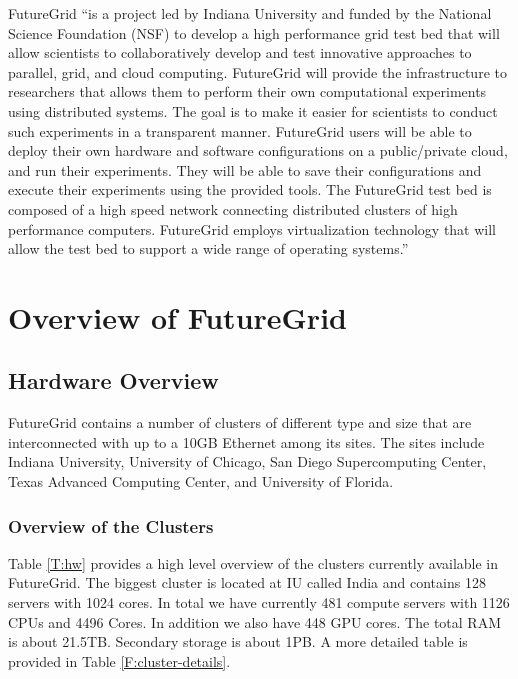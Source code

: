 \documentclass{article}
\newcommand{\FILE}[1]{}
\begin{document}
FutureGrid \cite{las2010gce,las12fg-bookchapter}``is a project led by Indiana University and funded by the National Science Foundation (NSF) to develop a high performance grid test bed that will allow scientists to collaboratively develop and test innovative approaches to parallel, grid, and cloud computing. FutureGrid will provide the infrastructure to researchers that allows them to perform their own computational experiments using distributed systems. The goal is to make it easier for scientists to conduct such experiments in a transparent manner.  FutureGrid users will be able to deploy their own hardware and software configurations on a public/private cloud, and run their experiments. They will be able to save their configurations and execute their experiments using the provided tools. The FutureGrid test bed is composed of a high speed network connecting distributed clusters of high performance computers. FutureGrid employs virtualization technology that will allow the test bed to support a wide range of operating systems.''



\section{Overview of FutureGrid}\label{S:overview}

\FILE{hardware.tex}

\subsection{Hardware Overview}

FutureGrid contains a number of clusters of different type and size that are interconnected with up to a 10GB Ethernet among its sites. The sites include Indiana University, University of Chicago, San Diego Supercomputing Center, Texas Advanced Computing Center, and University of Florida.

\subsubsection{Overview of the Clusters}\label{S:hw-cluster} 

Table \ref{T:hw} provides a high level overview of the clusters currently available in FutureGrid.  The biggest cluster is located at IU called India and contains 128 servers with 1024 cores. In total we have currently 481 compute servers with 1126 CPUs and 4496 Cores. In addition we also have 448 GPU cores. The total RAM is about 21.5TB. Secondary storage is about 1PB. A more detailed table is provided in Table \ref{F:cluster-details}.
\end{document}
